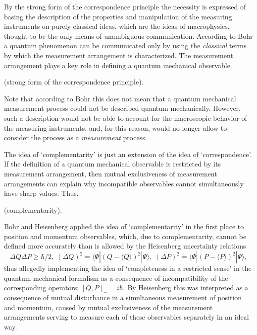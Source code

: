 \documentclass[12pt]{article}
\begin{document}
By the strong form of the correspondence principle the necessity
is expressed of basing the description of the properties and
manipulation of the measuring instruments on purely classical
ideas, which are the ideas of macrophysics, thought to be the
only means of unambiguous communication. According to Bohr a
quantum phenomenon can be communicated only by using the {\em
classical} terms by which the measurement arrangement is
characterized. The measurement arrangement plays a
key role in defining a quantum mechanical observable.

\medskip
{} (strong form of
the correspondence principle).
\medskip

\noindent Note that according to Bohr this does not mean that a
quantum mechanical measurement process could not be described
quantum mechanically. However, such a description would not be
able to account for the macroscopic behavior of the measuring
instruments, and, for this reason, would no longer allow to
consider the process as a {\em measurement} process.

The idea of `complementarity' is just an extension of the idea of
`correspondence'. If the definition of a quantum mechanical
observable is restricted by its measurement arrangement, then
mutual exclusiveness of measurement arrangements can explain why
incompatible observables cannot simultaneously have sharp values.
Thus,

\medskip
{} (complementarity).
\medskip

\noindent Bohr and Heisenberg applied the idea of
`complementarity' in the first place to position and momentum
observables, which, due to complementarity, cannot be defined more
accurately than is allowed by the Heisenberg uncertainty relations
\begin{equation}\label{7}
\Delta Q\Delta P\geq \hbar/2,\;(\Delta Q)^2= \langle
\Psi|(Q-\langle Q\rangle)^2|\Psi\rangle,\;(\Delta P)^2= \langle
\Psi|(P-\langle P\rangle)^2|\Psi\rangle,
\end{equation}
thus allegedly implementing the idea of `completeness in a
restricted sense' in the quantum mechanical formalism as a
consequence of incompatibility of the corresponding operators:
$[Q,P]_-=i\hbar$. By Heisenberg this was interpreted as a
consequence of mutual disturbance in a simultaneous measurement of
position and momentum, caused by mutual exclusiveness of the
measurement arrangements serving to measure each of these
observables separately in an ideal way.
\end{document}
